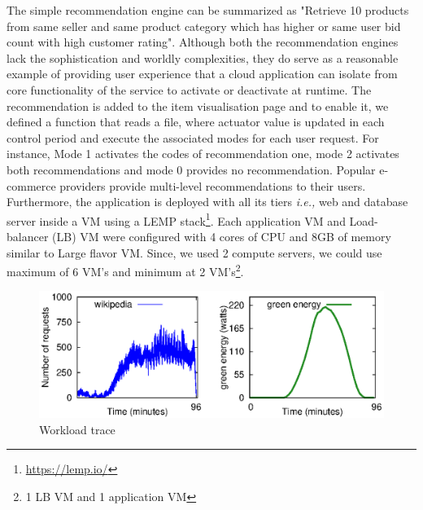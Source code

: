 The
simple recommendation engine can be summarized as "Retrieve 10 products from same seller and same product category which has higher or same user bid count with high customer rating". Although both the
recommendation engines lack the sophistication and worldly complexities, they do
serve as a reasonable example of providing user experience that a cloud
application can isolate from core functionality of the service 
to activate or
deactivate at runtime. The recommendation is added
to the item visualisation page and to enable it, we defined
a function that reads a file, where actuator value is updated
in each control period and execute the associated modes for
each user request. For instance, Mode 1 activates the codes of
recommendation one, mode 2 activates both recommendations
and mode 0 provides no recommendation. Popular e-commerce providers provide multi-level recommendations to their users. Furthermore, the application is deployed with all its tiers \emph{i.e.,} web and database server inside a VM using a LEMP stack\footnote{\url{https://lemp.io/}}. Each application VM and Load-balancer (LB) VM were configured with 4 cores of CPU and 8GB of memory similar to Large flavor VM. Since, we used 2 compute servers, we could use maximum of 6 VM's and minimum at 2 VM's\footnote{1 LB VM and 1 application VM}. 

\begin{figure}[h]
\includegraphics[scale=.7]{Graphs/workload_ucc.eps}
\caption{Workload trace}
\label{fig:workload} 
\end{figure}

